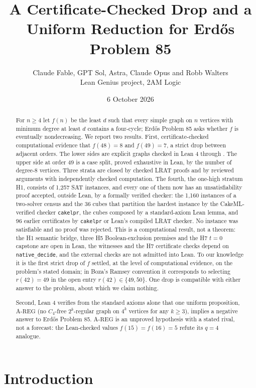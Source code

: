 \documentclass{anvil-paper}
\title{A Certificate-Checked Drop and a Uniform Reduction for Erdős Problem 85}
\author{Claude Fable, GPT Sol, Astra, Claude Opus and Robb Walters \\ Lean Genius project, 2AM Logic}
\date{6 October 2026}
\newcommand{\AREG}{\mathrm{A\text{-}REG}}
\newcommand{\cakelpr}{\texttt{cake\textunderscore lpr}}
\theoremstyle{definition}
\begin{document}
\maketitle

\begin{abstract}
For $n\ge 4$ let $f(n)$ be the least $d$ such that every simple graph on $n$ vertices with minimum degree at least $d$ contains a four-cycle; Erdős Problem 85 asks whether $f$ is eventually nondecreasing. We report two results. First, certificate-checked computational evidence that $f(48)=8$ and $f(49)=7$, a strict drop between adjacent orders. The lower sides are explicit graphs checked in Lean 4 through . The upper side at order 49 is a case split, proved exhaustive in Lean, by the number of degree-8 vertices. Three strata are closed by checked LRAT proofs and by reviewed arguments with independently checked computation. The fourth, the one-high stratum H1, consists of 1,257 SAT instances, and every one of them now has an unsatisfiability proof accepted, outside Lean, by a formally verified checker: the 1,160 instances of a two-solver census and the 36 cubes that partition the hardest instance by the CakeML-verified checker \cakelpr{}, the cubes composed by a standard-axiom Lean lemma, and 96 earlier certificates by \cakelpr{} or Lean's compiled LRAT checker. No instance was satisfiable and no proof was rejected. This is a computational result, not a theorem: the H1 semantic bridge, three H5 Boolean-exclusion premises and the H7 $t=0$ capstone are open in Lean, the witnesses and the H7 certificate checks depend on \texttt{native\_decide}, and the external checks are not admitted into Lean. To our knowledge it is the first strict drop of $f$ settled, at the level of computational evidence, on the problem's stated domain; in Boza's Ramsey convention it corresponds to selecting $r(42)=49$ in the open entry $r(42)\in\{49,50\}$. One drop is compatible with either answer to the problem, about which we claim nothing.

Second, Lean 4 verifies from the standard axioms alone that one uniform proposition, $\AREG$ (no $C_4$-free $2^k$-regular graph on $4^k$ vertices for any $k\ge 3$), implies a negative answer to Erdős Problem 85. $\AREG$ is an unproved hypothesis with a stated rival, not a forecast: the Lean-checked values $f(15)=f(16)=5$ refute its $q=4$ analogue.
\end{abstract}

\section{Introduction}\label{sec:intro}
\end{document}
